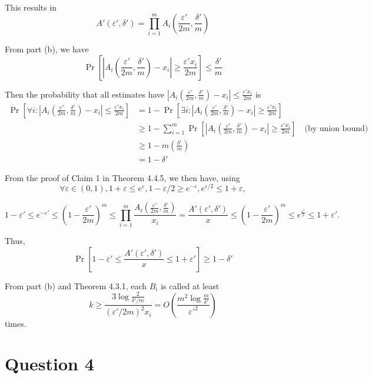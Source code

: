 \documentclass[11pt]{article} %
\begin{document}
This results in
\[A'(\varepsilon',\delta') = \prod_{i=1}^m A_i\left(\frac{\varepsilon'}{2m}, \frac{\delta'}{m}\right)\]

From part (b), we have
\[\Pr \left[\left|A_i\left(\frac{\varepsilon'}{2m}, \frac{\delta'}{m}\right) - x_i\right| 
\geq \frac{\varepsilon' x_i}{2m} \right]
\leq \frac{\delta'}{m}\]

Then the probability that all estimates have 
$\left|A_i\left(\frac{\varepsilon'}{2m}, \frac{\delta'}{m}\right) - x_i\right| 
\leq \frac{\varepsilon' x_i}{2m}$ 
is
\begin{equation}
\begin{aligned}
    \Pr \left[\forall i : \left|A_i\left(\frac{\varepsilon'}{2m}, \frac{\delta'}{m}\right) - x_i\right| 
    \leq \frac{\varepsilon' x_i}{2m} \right]
    &= 1 - \Pr \left[\exists i : \left|A_i\left(\frac{\varepsilon'}{2m}, \frac{\delta'}{m}\right) - x_i\right| 
    \geq \frac{\varepsilon' x_i}{2m} \right]\\
    &\geq 1 - \sum_{i=1}^m \Pr \left[\left|A_i\left(\frac{\varepsilon'}{2m}, \frac{\delta'}{m}\right) - x_i\right| 
    \geq \frac{\varepsilon' x_i}{2m} \right]
    \quad\text{(by union bound)}\\
    &\geq 1 - m\left(\frac{\delta'}{m}\right)\\
    &= 1 - \delta'
\end{aligned}
\end{equation}

From the proof of Claim 1 in Theorem 4.4.5, we then have, using 
\[\forall\varepsilon \in (0,1),1+\varepsilon\leq e^\varepsilon, 
1-\varepsilon/2\geq e^{-\varepsilon}, e^{\varepsilon/2}\leq 1 + \varepsilon,\]

\[1-\varepsilon' \leq e^{-\varepsilon'} \leq \left(1 - \frac{\varepsilon'}{2m}\right)^m 
\leq \prod_{i=1}^m \frac{A_i\left(\frac{\varepsilon'}{2m}, \frac{\delta'}{m}\right)}{x_i} 
= \frac{A'(\varepsilon',\delta')}{x}
\leq \left(1 - \frac{\varepsilon'}{2m}\right)^m 
\leq e^{\frac{\varepsilon'}{2}} \leq 1 + \varepsilon' .\]

Thus,
\[\Pr \left[1-\varepsilon' \leq \frac{A'(\varepsilon',\delta')}{x} \leq 1+\varepsilon'\right] \geq 1 - \delta'\]

From part (b) and Theorem 4.3.1, each $B_i$ is called at least 
\[k\geq \frac{3\log\frac{2}{\delta'/m}}{(\varepsilon'/2m)^2 x_i} 
= O\left(\frac{m^2 \log\frac{m}{\delta'}}{\varepsilon'^2}\right)\]
times.

\section*{Question 4}
\end{document}
